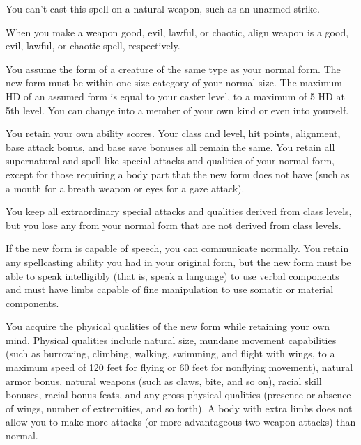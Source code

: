 \begin{multicols}{2}
\begin{small}
\smallskip\noindent You can't cast this spell on a natural weapon, such as an unarmed strike.

\smallskip\noindent When you make a weapon good, evil, lawful, or chaotic, align weapon is a good, evil, lawful, or chaotic spell, respectively.

\noindent You assume the form of a creature of the same type as your normal form. The new form must be within one size category of your normal size. The maximum HD of an assumed form is equal to your caster level, to a maximum of 5 HD at 5th level. You can change into a member of your own kind or even into yourself.

\smallskip\noindent You retain your own ability scores. Your class and level, hit points, alignment, base attack bonus, and base save bonuses all remain the same. You retain all supernatural and spell-like special attacks and qualities of your normal form, except for those requiring a body part that the new form does not have (such as a mouth for a breath weapon or eyes for a gaze attack).

\smallskip\noindent You keep all extraordinary special attacks and qualities derived from class levels, but you lose any from your normal form that are not derived from class levels.

\smallskip\noindent If the new form is capable of speech, you can communicate normally. You retain any spellcasting ability you had in your original form, but the new form must be able to speak intelligibly (that is, speak a language) to use verbal components and must have limbs capable of fine manipulation to use somatic or material components.

\smallskip\noindent You acquire the physical qualities of the new form while retaining your own mind. Physical qualities include natural size, mundane movement capabilities (such as burrowing, climbing, walking, swimming, and flight with wings, to a maximum speed of 120 feet for flying or 60 feet for nonflying movement), natural armor bonus, natural weapons (such as claws, bite, and so on), racial skill bonuses, racial bonus feats, and any gross physical qualities (presence or absence of wings, number of extremities, and so forth). A body with extra limbs does not allow you to make more attacks (or more advantageous two-weapon attacks) than normal.


\end{small}
\end{multicols}
